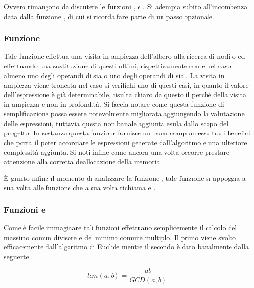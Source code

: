 \documentclass[11pt,letterpaper,twoside]{article}
\begin{document}

Ovvero rimangono da discutere le funzioni ,  e
. Si adempia subito all'incombenza data dalla funzione
, di cui si ricorda fare parte di un passo opzionale.

\subsubsection{Funzione } 

Tale funzione effettua una visita in ampiezza dell'albero alla ricerca di nodi
 o  ed effettuando una sostituzione di questi ultimi,
rispettivamente con  e  nel caso almeno uno degli
operandi di  sia  o uno degli operandi di 
sia . La visita in ampiezza viene troncata nel caso si verifichi
uno di questi casi, in quanto il valore dell'espressione è già determinabile,
risulta chiaro da questo il perchè della visita in ampiezza e non in profondità.
Si faccia notare come questa funzione di semplificazione possa essere
notevolmente migliorata aggiungendo la valutazione delle espressioni, tuttavia
questa non banale aggiunta esula dallo scopo del progetto.  In sostanza questa
funzione fornisce un buon compromesso tra i benefici che porta il poter
accorciare le espressioni generate dall'algoritmo e una ulteriore complessità
aggiunta. Si noti infine come ancora una volta occorre prestare attenzione alla
corretta deallocazione della memoria.

\`E giunto infine il momento di analizzare la funzione , tale
funzione si appoggia a sua volta alle funzione  che a sua volta
richiama  e .

\subsubsection{Funzioni  e } 

Come è facile immaginare tali funzioni effettuano semplicemente il calcolo del
massimo comun divisore e del minimo comune multiplo. Il primo viene svolto
efficacemente dall'algoritmo di Euclide\autocite{euclid} mentre il secondo è
dato banalmente dalla seguente.

$$lcm(a, b) = \frac{a b}{GCD(a, b)}$$
\end{document}
